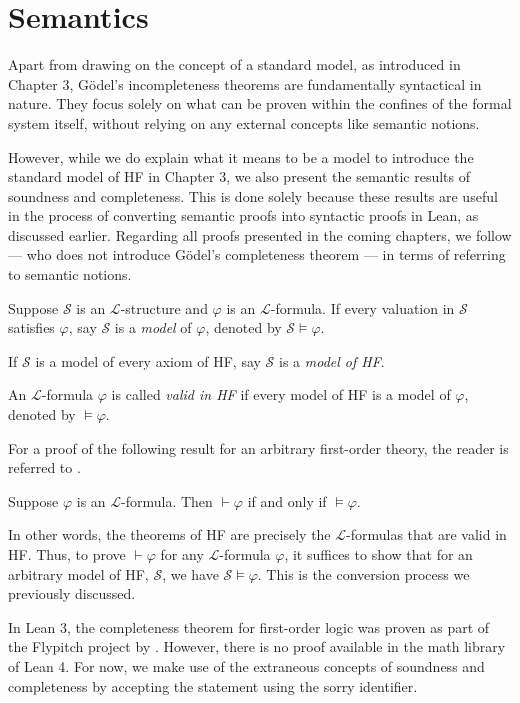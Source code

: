 \section{Semantics}

Apart from drawing on the concept of a standard model, as introduced in Chapter 3, 
Gödel's incompleteness theorems are fundamentally syntactical in nature. 
They focus solely on what can be proven within the confines of the formal system itself, 
without relying on any external concepts like semantic notions.

However, while we do explain what it means to be a model to introduce the standard model of 
HF in Chapter 3, we also present the semantic results of soundness and completeness. 
This is done solely because these results are useful in the process of converting semantic proofs 
into syntactic proofs in Lean, as discussed earlier.
Regarding all proofs presented in the coming chapters, we follow 
\cite{swierczkowski2003finite} — who does not introduce Gödel's completeness theorem — 
in terms of referring to semantic notions.

\begin{definition}
    \label{def:models+Model+valid}
    \leanok
    Suppose $\mathcal{S}$ is an $\mathcal{L}$-structure and $\varphi$ is an $\mathcal{L}$-formula.
    If every valuation in $\mathcal{S}$ satisfies $\varphi$, 
    say $\mathcal{S}$ is a \textit{model} of $\varphi$, denoted by $\mathcal{S} \vDash \varphi$.

    If $\mathcal{S}$ is a model of every axiom of HF, say $\mathcal{S}$ is a \textit{model of HF}.
    
    An $\mathcal{L}$-formula $\varphi$ is called \textit{valid in HF} if 
    every model of HF is a model of $\varphi$, denoted by $\vDash \varphi$.
\end{definition}

For a proof of the following result for an arbitrary first-order theory, 
the reader is referred to  \cite{shoenfield1967mathematical}.

\begin{theorem}
    \label{thm:completeness}
    \leanok
    Suppose $\varphi$ is an $\mathcal{L}$-formula.
    Then $\vdash \varphi$ if and only if $\vDash \varphi$.
\end{theorem}

In other words, the theorems of HF are precisely the $\mathcal{L}$-formulas that are valid in HF.
Thus, to prove $\vdash \varphi$ for any $\mathcal{L}$-formula $\varphi$, it suffices to show that for an 
arbitrary model of HF, $\mathcal{S}$, we have $\mathcal{S} \vDash \varphi$.
This is the conversion process we previously discussed.

In Lean 3, the completeness theorem for first-order logic was proven as part of the Flypitch project
by \cite{han2020formal}.
However, there is no proof available in the math library of Lean 4.
For now, we make use of the extraneous concepts of soundness and completeness 
by accepting the statement using the {\ttfamily \small sorry} identifier. 